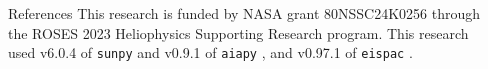 \documentclass[final]{beamer}
\newlength{\sepwidth}
\newlength{\colwidth}
\newcommand{\separatorcolumn}{\begin{column}{\sepwidth}\end{column}}
\begin{document}
\begin{frame}[t]
\begin{columns}[t]
\begin{column}{\colwidth}
  \begin{block}{References}
    \scriptsize
    This research is funded by NASA grant 80NSSC24K0256 through the ROSES 2023 Heliophysics Supporting Research program.
    This research used v6.0.4 of \texttt{sunpy} \citep{the_sunpy_community_sunpy_2020} and v0.9.1 of \texttt{aiapy} \citep{barnes_aiapy_2020}, and v0.97.1 of \texttt{eispac} \citep{weberg_eispac_2023}.
    \begin{multicols}{2}
      
      
    \end{multicols}
  \end{block}

\end{column}

\separatorcolumn
\end{columns}
\end{frame}
\end{document}
